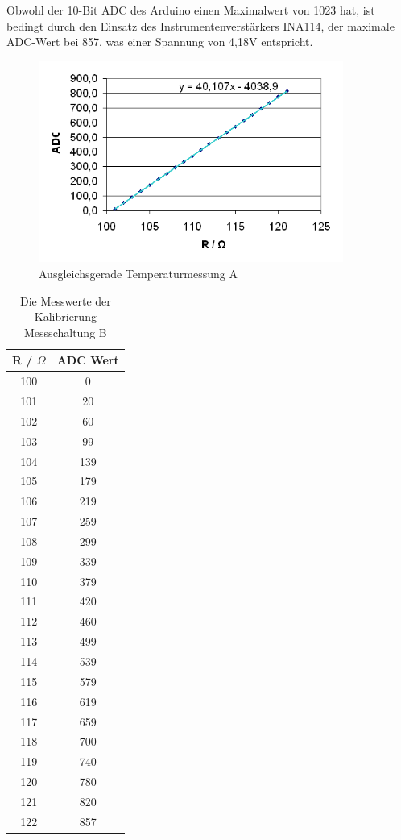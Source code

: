 \documentclass[a4paper,bibtotoc,oneside]{scrbook}
\begin{document}
Obwohl der 10-Bit ADC des Arduino einen Maximalwert von 1023 hat, ist bedingt durch den Einsatz des Instrumentenverstärkers INA114, der maximale ADC-Wert bei 857, was einer Spannung von 4,18V entspricht.  


\begin{figure}[htbp]
\centering
\includegraphics[width=100mm]{img/messa.png}
\caption{Ausgleichsgerade Temperaturmessung A}\label{messa}
\end{figure}

\begin{table}[htbp]
\centering
\begin{tabular}{ | c | c | }\hline
{\bf R / $\Omega$ } & {\bf ADC Wert}\\ \hline
\hline
100 & 0\\ \hline
101 & 20\\ \hline
102 & 60\\ \hline
103 & 99\\ \hline
104 & 139\\ \hline
105 & 179\\ \hline
106 & 219\\ \hline
107 & 259\\ \hline
108 & 299\\ \hline
109 & 339\\ \hline
110 & 379\\ \hline
111 & 420\\ \hline
112 & 460\\ \hline
113 & 499\\ \hline
114 & 539\\ \hline
115 & 579\\ \hline
116 & 619\\ \hline
117 & 659\\ \hline
118 & 700\\ \hline
119 & 740\\ \hline
120 & 780\\ \hline
121 & 820\\ \hline
122 & 857\\ \hline
\end{tabular}
\caption{Die Messwerte der Kalibrierung Messschaltung B}\label{TabB}
\end{table}
\end{document}
